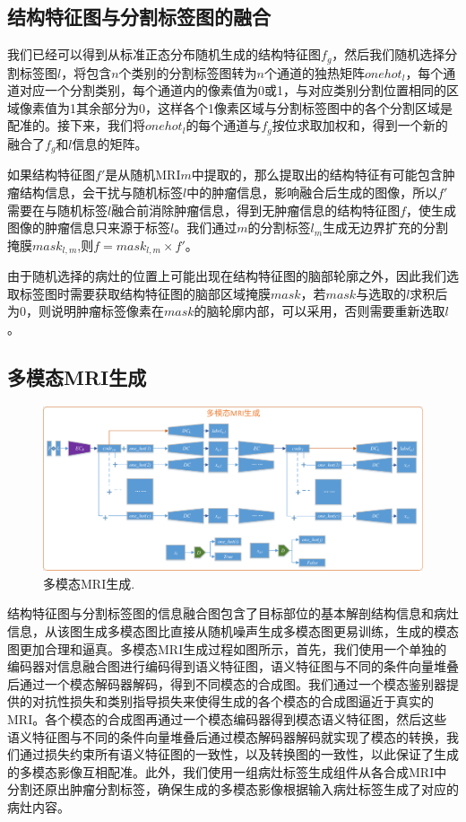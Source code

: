 \documentclass[letterpaper]{article} %
\begin{document}
\subsection{结构特征图与分割标签图的融合}
我们已经可以得到从标准正态分布随机生成的结构特征图$f_g$，然后我们随机选择分割标签图$l$，将包含$n$个类别的分割标签图转为$n$个通道的独热矩阵$onehot_l$，每个通道对应一个分割类别，每个通道内的像素值为0或1，与对应类别分割位置相同的区域像素值为1其余部分为0，这样各个1像素区域与分割标签图中的各个分割区域是配准的。接下来，我们将$onehot_l$的每个通道与$f_g$按位求取加权和，得到一个新的融合了$f_g$和$l$信息的矩阵。

如果结构特征图$f'$是从随机MRI$m$中提取的，那么提取出的结构特征有可能包含肿瘤结构信息，会干扰与随机标签$l$中的肿瘤信息，影响融合后生成的图像，所以$f'$需要在与随机标签$l$融合前消除肿瘤信息，得到无肿瘤信息的结构特征图$f$，使生成图像的肿瘤信息只来源于标签$l$。我们通过$m$的分割标签$l_m$生成无边界扩充的分割掩膜$mask_{l,m}$,则$f=mask_{l,m}\times f'$。

由于随机选择的病灶的位置上可能出现在结构特征图的脑部轮廓之外，因此我们选取标签图时需要获取结构特征图的脑部区域掩膜$mask$，若$mask$与选取的$l$求积后为0，则说明肿瘤标签像素在$mask$的脑轮廓内部，可以采用，否则需要重新选取$l$。

\subsection{多模态MRI生成}
\begin{figure}
	\centering
	\includegraphics[width=0.98\linewidth]{figures/mm_mri_generate}
	\caption{多模态MRI生成.}
	\label{mm_mri_generate}
\end{figure}
结构特征图与分割标签图的信息融合图包含了目标部位的基本解剖结构信息和病灶信息，从该图生成多模态图比直接从随机噪声生成多模态图更易训练，生成的模态图更加合理和逼真。多模态MRI生成过程如图所示，首先，我们使用一个单独的编码器对信息融合图进行编码得到语义特征图，语义特征图与不同的条件向量堆叠后通过一个模态解码器解码，得到不同模态的合成图。我们通过一个模态鉴别器提供的对抗性损失和类别指导损失来使得生成的各个模态的合成图逼近于真实的MRI。各个模态的合成图再通过一个模态编码器得到模态语义特征图，然后这些语义特征图与不同的条件向量堆叠后通过模态解码器解码就实现了模态的转换，我们通过损失约束所有语义特征图的一致性，以及转换图的一致性，以此保证了生成的多模态影像互相配准。此外，我们使用一组病灶标签生成组件从各合成MRI中分割还原出肿瘤分割标签，确保生成的多模态影像根据输入病灶标签生成了对应的病灶内容。
\end{document}
